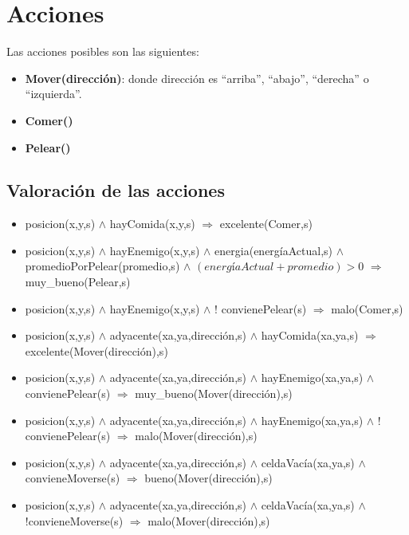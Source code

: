 \section{Acciones}

Las acciones posibles son las siguientes:

\begin{itemize}

\item \textbf{Mover(dirección)}: donde dirección es ``arriba'', ``abajo'',
``derecha'' o ``izquierda''.

\item \textbf{Comer()}

\item \textbf{Pelear()}

\end{itemize}

\subsection{Valoración de las acciones}

\begin{itemize}

\item posicion(x,y,s) $\land$ hayComida(x,y,s) $\Rightarrow$ excelente(Comer,s)

\item posicion(x,y,s) $\land$ hayEnemigo(x,y,s) $\land$ energia(energíaActual,s)
$\land$ promedioPorPelear(promedio,s) $\land$ $(energíaActual + promedio) > 0$
$\Rightarrow$ \linebreak muy\_bueno(Pelear,s)

\item posicion(x,y,s) $\land$ hayEnemigo(x,y,s) $\land$ ! convienePelear(s)
$\Rightarrow$ malo(Comer,s)

\item posicion(x,y,s) $\land$ adyacente(xa,ya,dirección,s) $\land$
hayComida(xa,ya,s) $\Rightarrow$ excelente(Mover(dirección),s)

\item posicion(x,y,s) $\land$ adyacente(xa,ya,dirección,s) $\land$
hayEnemigo(xa,ya,s)  $\land$ convienePelear(s) $\Rightarrow$
muy\_bueno(Mover(dirección),s)

\item posicion(x,y,s) $\land$ adyacente(xa,ya,dirección,s) $\land$
hayEnemigo(xa,ya,s) $\land$ ! convienePelear(s)
$\Rightarrow$ malo(Mover(dirección),s)

\item posicion(x,y,s) $\land$ adyacente(xa,ya,dirección,s) $\land$
celdaVacía(xa,ya,s) $\land$ convieneMoverse(s) $\Rightarrow$
bueno(Mover(dirección),s)

\item posicion(x,y,s) $\land$ adyacente(xa,ya,dirección,s) $\land$
celdaVacía(xa,ya,s) $\land$ !convieneMoverse(s)
$\Rightarrow$ malo(Mover(dirección),s)

\end{itemize}


